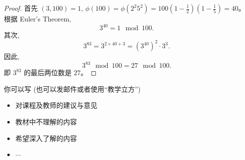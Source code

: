 \documentclass[a4paper, justified]{tufte-handout}
\begin{document}
\begin{proof}
  首先 $(3, 100) = 1$, $\phi(100) = \phi(2^2 5^2) = 100 (1 - \frac{1}{2})(1 - \frac{1}{5}) = 40$。
  根据 Euler's Theorem,
  \[
    3^{40} = 1 \mod{100}.
  \]
  其次,
  \[
    3^{83} = 3^{2 \times 40 + 3} = (3^{40})^{2} \cdot 3^{3}.
  \]
  因此,
  \[
    3^{83} \mod{100} = 27 \mod{100}.
  \]
  即 $3^{83}$ 的最后两位数是 $27$。
\end{proof}

\begincorrection

\beginfb

你可以写 (也可以发邮件或者使用``教学立方'')
\begin{itemize}
  \item 对课程及教师的建议与意见
  \item 教材中不理解的内容
  \item 希望深入了解的内容
  \item $\cdots$
\end{itemize}
\end{document}
